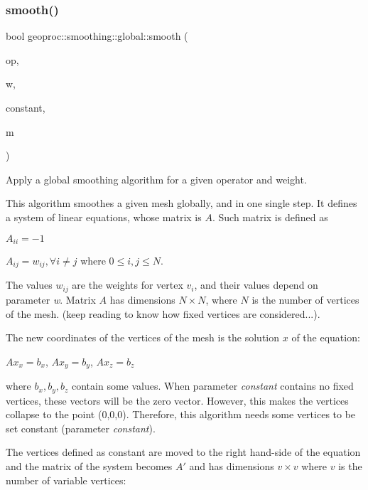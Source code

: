 \subsubsection{\texorpdfstring{smooth()}{smooth()}}
{\footnotesize\ttfamily bool geoproc\+::smoothing\+::global\+::smooth (\begin{DoxyParamCaption}\item[{const \hyperlink{namespacegeoproc_1_1smoothing_a64c2bfd1dda6cfbf39afa2e61fd62537}{smooth\+\_\+operator} \&}]{op,  }\item[{const \hyperlink{namespacegeoproc_1_1smoothing_a76e43f405426c150569712512de58028}{smooth\+\_\+weight} \&}]{w,  }\item[{const std\+::vector$<$ bool $>$ \&}]{constant,  }\item[{\hyperlink{classgeoproc_1_1TriangleMesh}{Triangle\+Mesh} \&}]{m }\end{DoxyParamCaption})}



Apply a global smoothing algorithm for a given operator and weight. 

This algorithm smoothes a given mesh globally, and in one single step. It defines a system of linear equations, whose matrix is $A$. Such matrix is defined as
\begin{DoxyItemize}
\item $A_{ii} = -1$
\item $A_{ij} = w_{ij}, \forall i \neq j$ where $ 0 \le i,j \le N$.
\end{DoxyItemize}

The values $w_{ij}$ are the weights for vertex $v_i$, and their values depend on parameter {\itshape w}. Matrix $A$ has dimensions $N \times N$, where $N$ is the number of vertices of the mesh. (keep reading to know how fixed vertices are considered...).

The new coordinates of the vertices of the mesh is the solution $x$ of the equation\+:

$Ax_x = b_x$, $Ax_y = b_y$, $Ax_z = b_z$

where $b_x,b_y,b_z$ contain some values. When parameter {\itshape constant} contains no fixed vertices, these vectors will be the zero vector. However, this makes the vertices collapse to the point (0,0,0). Therefore, this algorithm needs some vertices to be set constant (parameter {\itshape constant}).

The vertices defined as constant are moved to the right hand-\/side of the equation and the matrix of the system becomes $A'$ and has dimensions $v \times v$ where $v$ is the number of variable vertices\+:

